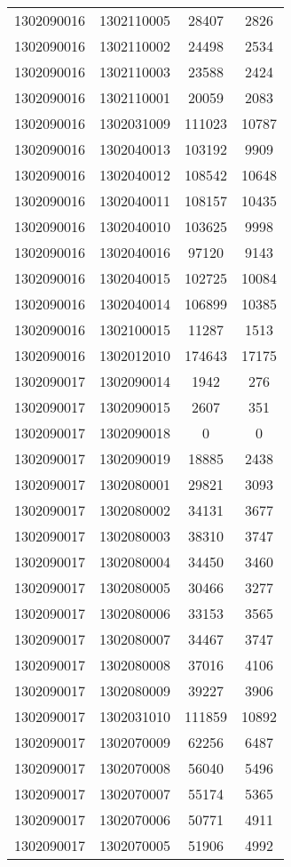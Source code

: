 \begin{longtable}{llcc}
1302090016 & 1302110005 & 28407 & 2826\\
1302090016 & 1302110002 & 24498 & 2534\\
1302090016 & 1302110003 & 23588 & 2424\\
1302090016 & 1302110001 & 20059 & 2083\\
1302090016 & 1302031009 & 111023 & 10787\\
1302090016 & 1302040013 & 103192 & 9909\\
1302090016 & 1302040012 & 108542 & 10648\\
1302090016 & 1302040011 & 108157 & 10435\\
1302090016 & 1302040010 & 103625 & 9998\\
1302090016 & 1302040016 & 97120 & 9143\\
1302090016 & 1302040015 & 102725 & 10084\\
1302090016 & 1302040014 & 106899 & 10385\\
1302090016 & 1302100015 & 11287 & 1513\\
1302090016 & 1302012010 & 174643 & 17175\\
1302090017 & 1302090014 & 1942 & 276\\
1302090017 & 1302090015 & 2607 & 351\\
1302090017 & 1302090018 & 0 & 0\\
1302090017 & 1302090019 & 18885 & 2438\\
1302090017 & 1302080001 & 29821 & 3093\\
1302090017 & 1302080002 & 34131 & 3677\\
1302090017 & 1302080003 & 38310 & 3747\\
1302090017 & 1302080004 & 34450 & 3460\\
1302090017 & 1302080005 & 30466 & 3277\\
1302090017 & 1302080006 & 33153 & 3565\\
1302090017 & 1302080007 & 34467 & 3747\\
1302090017 & 1302080008 & 37016 & 4106\\
1302090017 & 1302080009 & 39227 & 3906\\
1302090017 & 1302031010 & 111859 & 10892\\
1302090017 & 1302070009 & 62256 & 6487\\
1302090017 & 1302070008 & 56040 & 5496\\
1302090017 & 1302070007 & 55174 & 5365\\
1302090017 & 1302070006 & 50771 & 4911\\
1302090017 & 1302070005 & 51906 & 4992\\

\end{longtable}
